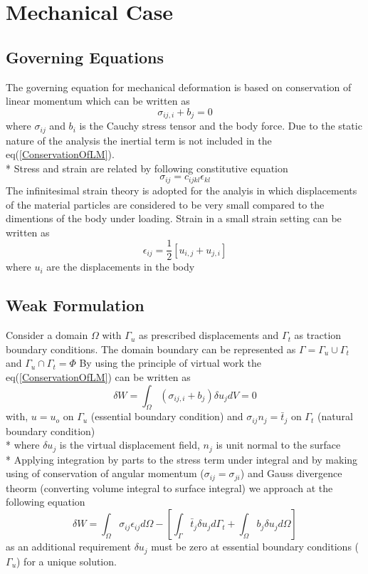 \documentclass[11pt]{article}
\begin{document}
\section{Mechanical Case}


\subsection{Governing Equations}
The governing equation for mechanical deformation is based on conservation of
linear momentum which can be written as
\begin{equation}\label{ConservationOfLM}
\sigma_{ij,i} + b_j = 0
\end{equation}
where $ \sigma_{ij} $ and $ b_i $ is the Cauchy stress tensor and the body force.
Due to the static nature of the analysis the inertial term is not included in
the eq(\ref{ConservationOfLM}).\\*
Stress and strain are related by following constitutive equation
\begin{equation}
\sigma_{ij} = c_{ijkl} \epsilon_{kl}
\end{equation}
The infinitesimal strain theory is adopted for the analyis in which
displacements of the material particles are considered to be very small compared
to the dimentions of the body under loading. Strain in a small strain setting
can be written as
\begin{equation}
\epsilon_{ij}=\frac{1}{2}[u_{i,j}+u_{j,i}]
\end{equation}
where $ u_{i} $ are the displacements in the body


\subsection{Weak Formulation}
Consider a domain $\Omega$ with $\Gamma_u$ as prescribed displacements and
$\Gamma_t$ as traction boundary conditions. The domain boundary can be
represented as $\Gamma = \Gamma_u \cup \Gamma_t$ and $\Gamma_u \cap \Gamma_t =
\Phi$
By using the principle of virtual work the eq(\ref{ConservationOfLM}) can be written as
\begin{equation}
\delta W = \int_\Omega (\sigma_{ij,i} + b_j ) \delta u_j dV = 0
\end{equation} 
with,
$u = u_o$ on $\Gamma_u$ (essential boundary condition) and
$\sigma_{ij}n_j = \bar{t}_j$ on $\Gamma_t$ (natural boundary condition) \\*
where $\delta u_j$ is the virtual displacement field, $n_j$ is unit normal to
the surface \\*
Applying integration by parts to the stress term under integral and by making
using of conservation of angular momentum ($ \sigma_{ij} = \sigma_{ji} $) and
Gauss divergence theorm (converting volume integral to surface integral) we
approach at the following equation
\begin{equation} \label{FinalWeakform}
\delta W = \int_{\Omega} \sigma_{ij} \epsilon_{ij} d\Omega - \left[
\int_{\Gamma} \bar{t}_j \delta u_j d\Gamma_t  + \int_{\Omega} b_j \delta u_j
d\Omega \right]
\end{equation}
as an additional requirement $\delta u_j$ must be zero at essential boundary
conditions ($\Gamma_u$) for a unique solution.
\end{document}
